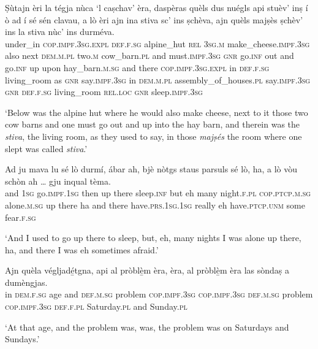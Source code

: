 \begin{linenumbers}
\gll Ṣùtajn èri la tégja nùca `l caṣchav' èra, daspèras quèls dus nuégls api stuèv' inṣ í ò ad í sé sén clavau, a lò èri ajn ina stiva sc’ ins ṣchèva, ajn quèls majṣès ṣchèv’ ins la stiva nùc’ ins durméva.\\
under\_in \textsc{cop.impf.3sg.expl} \textsc{def.f.sg} alpine\_hut \textsc{rel} \textsc{3sg.m} make\_cheese.\textsc{impf.3sg} also next \textsc{dem.m.pl} two.\textsc{m} cow\_barn.\textsc{pl} and must.\textsc{impf.3sg} \textsc{gnr} go.\textsc{inf} out and go.\textsc{inf} up upon hay\_barn.\textsc{m.sg} and there \textsc{cop.impf.3sg.expl} in \textsc{def.f.sg} living\_room as \textsc{gnr} say.\textsc{impf.3sg} in \textsc{dem.m.pl} assembly\_of\_houses.\textsc{pl} say.\textsc{impf.3sg} \textsc{gnr} \textsc{def.f.sg} living\_room  \textsc{rel.loc} \textsc{gnr} sleep.\textsc{impf.3sg}\\
\end{linenumbers}
\medskip
\glt `Below was the alpine hut where he would also make cheese, next to it those two cow barns and one must go out and up into the hay barn, and therein was the \textit{stiva}, the living room, as they used to say, in those \textit{majṣés} the room where one slept was called \textit{stiva}.'
\medskip

\begin{linenumbers}
\gll  Ad ju mava lu sé lò durmí, ábar ah, bjè nòtgs staus parsuls sé lò, ha, a lò vòu schòn ah … gju inqual tèma.   \\
and \textsc{1sg} go.\textsc{impf.1sg} then up there sleep.\textsc{inf} but eh many night.\textsc{f.pl} \textsc{cop.ptcp.m.sg} alone.\textsc{m.sg} up there ha and there have.\textsc{prs.1sg.1sg} really eh {} have.\textsc{ptcp.unm} some fear.\textsc{f.sg} \\
\end{linenumbers}
\medskip
\glt `And I used to go up there to sleep, but, eh, many nights I was alone up there, ha, and there I was eh sometimes afraid.'
\medskip

\begin{linenumbers}
\gll  Ajn quèla végljadé̱tgna, api al pròblè̱m èra, èra, al pròblè̱m èra las sòndaṣ a dumèngjas.   \\
in  \textsc{dem.f.sg} age and \textsc{def.m.sg} problem \textsc{cop.impf.3sg} \textsc{cop.impf.3sg} \textsc{def.m.sg} problem \textsc{cop.impf.3sg} \textsc{def.f.pl} Saturday.\textsc{pl} and Sunday.\textsc{pl} \\
\end{linenumbers}
\medskip
\glt `At that age, and the problem was, was, the problem was on Saturdays and Sundays.'
\medskip

